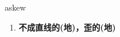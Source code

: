 
\begin{frame}
{\huge askew}
\begin{center}
\begin{enumerate}\Large
  \item \textbf{不成直线的(地)，歪的(地)}
\end{enumerate}
\end{center}
\end{frame}
